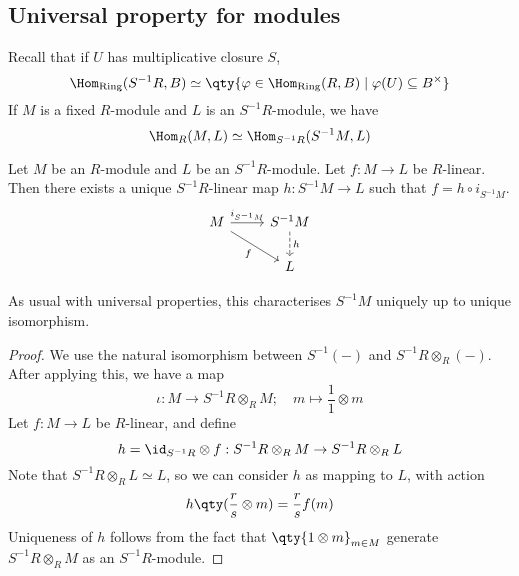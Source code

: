 \subsection{Universal property for modules}
Recall that if \( U \) has multiplicative closure \( S \),
\[ \Hom_{\text{Ring}}(S^{-1}R, B) \simeq \qty{\varphi \in \Hom_{\text{Ring}}(R, B) \mid \varphi(U) \subseteq B^\times} \]
If \( M \) is a fixed \( R \)-module and \( L \) is an \( S^{-1}R \)-module, we have
\[ \Hom_R(M, L) \simeq \Hom_{S^{-1}R}(S^{-1}M, L) \]
\begin{proposition}
    Let \( M \) be an \( R \)-module and \( L \) be an \( S^{-1}R \)-module.
    Let \( f : M \to L \) be \( R \)-linear.
    Then there exists a unique \( S^{-1}R \)-linear map \( h : S^{-1}M \to L \) such that \( f = h \circ i_{S^{-1}M} \).
\[\begin{tikzcd}
	M & {S^{-1}M} \\
	& L
	\arrow["{i_{S^{-1}M}}", from=1-1, to=1-2]
	\arrow["h", dashed, from=1-2, to=2-2]
	\arrow["f"', from=1-1, to=2-2]
\end{tikzcd}\]
\end{proposition}
As usual with universal properties, this characterises \( S^{-1}M \) uniquely up to unique isomorphism.
\begin{proof}
    We use the natural isomorphism between \( S^{-1}(-) \) and \( S^{-1}R \otimes_R (-) \).
    After applying this, we have a map
    \[ \iota : M \to S^{-1}R \otimes_R M;\quad m \mapsto \frac{1}{1} \otimes m \]
    Let \( f : M \to L \) be \( R \)-linear, and define
    \[ h = \id_{S^{-1}R} \otimes f : S^{-1}R \otimes_R M \to S^{-1}R \otimes_R L \]
    Note that \( S^{-1}R \otimes_R L \simeq L \), so we can consider \( h \) as mapping to \( L \), with action
    \[ h\qty(\frac{r}{s} \otimes m) = \frac{r}{s}f(m) \]
    Uniqueness of \( h \) follows from the fact that \( \qty{1 \otimes m}_{m \in M} \) generate \( S^{-1}R \otimes_R M \) as an \( S^{-1}R \)-module.
\end{proof}

